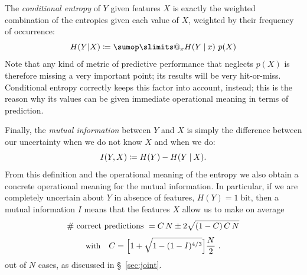 \documentclass[\ifafour a4paper,12pt,\else a5paper,10pt,\fi%
onecolumn,oneside,article,%
british%
]{memoir}
\makeatletter
\theoremstyle{remark}
\theoremstyle{innote}
\def\sum{\DOTSI\sumop\slimits@}
\newcommand*{\de}{\partialup}%
\newcommand*{\defd}{\coloneqq}
\newcommand*{\p}{\mathrm{p}}%
\renewcommand*{\|}[1][]{\nonscript\:#1\vert\nonscript\:\mathopen{}}
\newcommand*{\sect}{\S}%
\newcommand*{\tsum}{\mathop{\textstyle\sum}\nolimits}
\newcommand*{\bit}{\textrm{bit}}
\makeatother
\begin{document}
The \emph{conditional entropy} of $Y$ given features $X$ is exactly the
weighted combination of the entropies given each value of $X$, weighted by
their frequency of occurrence:
\begin{equation}
  \label{eq:cond_entr}
  H(Y|X) \defd \sum_{x} H(Y\|x)\ p(X)
\end{equation}
Note that any kind of metric of predictive performance that neglects $p(X)$
is therefore missing a very important point; its results will be very
hit-or-miss. Conditional entropy correctly keeps this factor into account,
instead; this is the reason why its values can be given immediate
operational meaning in terms of prediction.


Finally, the \emph{mutual information}  between $Y$ and $X$ is simply the
difference between our uncertainty when we do not know $X$ and when we do:
\begin{equation}
  \label{eq:mutualinfo}
  I(Y,X) \defd H(Y) - H(Y\|X).
\end{equation}
From this definition and the operational meaning of the entropy we also
obtain a concrete operational meaning for the mutual information. In
particular, if we are completely uncertain about $Y$ in absence of
features, $H(Y)=1\;\bit$, then a mutual information $I$ means that the
features $X$ allow us to make on average
\begin{equation}
  \label{eq:entropy_est}
  \begin{gathered}
    \text{\# correct predictions } = C\,N \pm 2\sqrt{(1-C)\,C\,N}
    \\[1\jot]
    \text{\small with}\quad C = \Bigl[1+\sqrt{1-(1-I)^{4/3}}\Bigr]\frac{N}{2} \ .
\end{gathered}
\end{equation}
out of $N$ cases, as discussed in \sect~\ref{sec:joint}.




\end{document}
